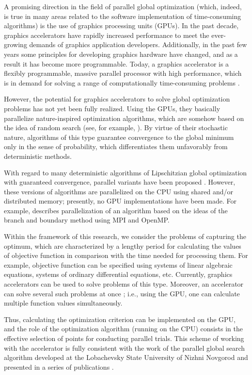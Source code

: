 \documentclass{svproc}
\begin{document}
A promising direction in the field of parallel global optimization (which, indeed, is true in many areas related to the software implementation of time-consuming algorithms) is the use of graphics processing units (GPUs). In the past decade, graphics accelerators have rapidly increased performance to meet the ever-growing demands of graphics application developers. Additionally, in the past few years some principles for developing graphics hardware have changed, and as a result it has become more programmable. Today, a graphics accelerator is a flexibly programmable, massive parallel processor with high performance, which is in demand for solving a range of computationally time-consuming problems \cite{Hwu2011}.

However, the potential for graphics accelerators to solve global optimization problems has not yet been fully realized. Using the GPUs, they basically parallelize nature-inspired optimization algorithms, which are somehow based on the idea of random search (see, for example, \cite{Ferreiro2013,Garcia2014,Langdon2011}). By virtue of their stochastic nature, algorithms of this type guarantee convergence to the global minimum only in the sense of probability, which differentiates them unfavorably from deterministic methods.

With regard to many deterministic algorithms of Lipschitzian global optimization with guaranteed convergence, parallel variants have been proposed \cite{Evtushenko2009,He2008,Paulavicius2011}. However, these versions of algorithms are parallelized on the CPU using shared and/or distributed memory; presently, no GPU implementations have been made. For example, \cite{Paulavicius2011} describes parallelization of an algorithm based on the ideas of the branch and boundary method using MPI and OpenMP.

Within the framework of this research, we consider the problems of capturing the optimum, which are characterized by a lengthy period for calculating the values of objective function in comparison with the time needed for processing them. For example, objective function can be specified using systems of linear algebraic equations, systems of ordinary differential equations, etc. Currently, graphics accelerators can be used to solve problems of this type. Moreover, an accelerator can solve several such problems at once \cite{Kindratenko2014}; i.e., using the GPU, one can calculate multiple function values simultaneously.

Thus, calculating the optimization criterion can be implemented on the GPU, and the role of the optimization algorithm (running on the CPU) consists in the effective selection of points for conducting parallel trials. This scheme of working with the accelerator is fully consistent with the work of the parallel global search algorithm developed at the Lobachevsky State University of Nizhni Novgorod and presented in a series of publications \cite{Barkalov2014,Barkalov2020,Barkalov2019,Grishagin2016,Grishagin2015,Grishagin2018,Strongin2000}.
\end{document}
